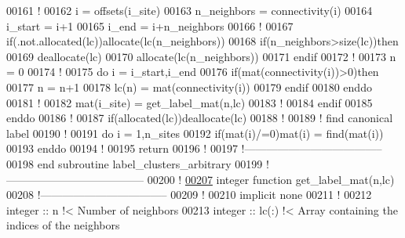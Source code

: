 \begin{DoxyCode}
00161           \textcolor{comment}{!}
00162           i = offsets(i\_site)
00163           n\_neighbors = connectivity(i)
00164           i\_start = i+1
00165           i\_end   = i+n\_neighbors
00166           \textcolor{comment}{!}
00167           \textcolor{keyword}{if}(.not.\textcolor{keyword}{allocated}(lc))\textcolor{keyword}{allocate}(lc(n\_neighbors))
00168           \textcolor{keyword}{if}(n\_neighbors>\textcolor{keyword}{size}(lc))\textcolor{keyword}{then}
00169              \textcolor{keyword}{deallocate}(lc)
00170              \textcolor{keyword}{allocate}(lc(n\_neighbors))
00171           \textcolor{keyword}{endif}
00172           \textcolor{comment}{!}
00173           n = 0
00174           \textcolor{comment}{!}
00175           \textcolor{keyword}{do} i = i\_start,i\_end
00176              \textcolor{keyword}{if}(mat(connectivity(i))>0)\textcolor{keyword}{then}
00177                 n = n+1
00178                 lc(n) = mat(connectivity(i))
00179              \textcolor{keyword}{endif}
00180           \textcolor{keyword}{enddo}
00181           \textcolor{comment}{!}
00182           mat(i\_site) = get\_label\_mat(n,lc)
00183           \textcolor{comment}{!}
00184        \textcolor{keyword}{endif}
00185     \textcolor{keyword}{enddo}
00186     \textcolor{comment}{!}
00187     \textcolor{keyword}{if}(\textcolor{keyword}{allocated}(lc))\textcolor{keyword}{deallocate}(lc)
00188     \textcolor{comment}{!}
00189     \textcolor{comment}{! find canonical label}
00190     \textcolor{comment}{!}
00191     \textcolor{keyword}{do} i = 1,n\_sites
00192        \textcolor{keyword}{if}(mat(i)/=0)mat(i) = find(mat(i))
00193     \textcolor{keyword}{enddo}
00194     \textcolor{comment}{!}
00195     return
00196     \textcolor{comment}{!}
00197   \textcolor{comment}{!--------------------------------------}
00198 \textcolor{keyword}{  end subroutine label\_clusters\_arbitrary}
00199   \textcolor{comment}{!--------------------------------------}
00200   \textcolor{comment}{!}
\hypertarget{module__label__clusters_8f90_source_l00207}{}\hyperlink{classmodule__label__clusters_a293fe1439386c2fdcaddda3f2325162c}{00207}   \textcolor{keyword}{integer }\textcolor{keyword}{function }get\_label\_mat(n,lc)
00208   \textcolor{comment}{!-----------------------------------}
00209     \textcolor{comment}{!}
00210     \textcolor{keyword}{implicit none}
00211     \textcolor{comment}{!}
00212     \textcolor{keywordtype}{integer} :: n \textcolor{comment}{!< Number of neighbors}
00213     \textcolor{keywordtype}{integer} :: lc(:) \textcolor{comment}{!< Array containing the indices of the neighbors}

\end{DoxyCode}
